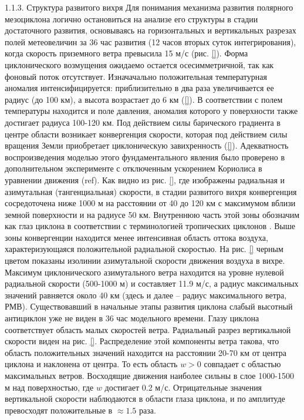 1.1.3.	Структура развитого вихря
Для понимания механизма развития полярного мезоциклона логично остановиться на анализе его структуры в стадии достаточного развития, основываясь на горизонтальных и вертикальных разрезах полей метеовеличин за 36 час развития (12 часов вторых суток интегрирования), когда скорость приземного ветра превысила 15 м/с (рис. \ref{}).
Форма циклонического возмущения ожидаемо остается осесимметричной, так как фоновый поток отсутствует. Изначачально положительная температурная аномалия интенсифицируется: приблизительно в два раза увеличивается ее радиус (до 100 км), а высота возрастает до 6 км (\ref{}). В соответствии с полем температуры находится и поле давления, аномалия которого у поверхности также достигает радиуса 100-120 км. 
Под действием силы барического градиента в центре области возникает конвергенция скорости, которая под действием силы вращения Земли приобретает циклоническую завихренность (\ref{}). Адекватность воспроизведения моделью этого фундаментального явления было проверено в дополнительном эксперименте с отключенным ускорением Кориолиса в уравнении движения (ref{}). Как видно из рис. \ref{}, где изображены радиальная и азимутальная (тангенциальная) скорости, в стадии развитого вихря конвергенция сосредоточена ниже 1000 м на расстоянии от 40 до 120 км с максимумом вблизи земной поверхности и на радиусе 50 км. Внутреннюю часть этой зоны обозначим как глаз циклона в соответствии с терминологией тропических циклонов \cite{Глебова_диссер}. Выше зоны конвергенции находится менее интенсивная область оттока воздуха, характеризующаяся положительной радиальной скоростью.
На рис. \ref{} черным цветом показаны изолинии азимутальной скорости движения воздуха в вихре. Максимум циклонического азимутального ветра находится на уровне нулевой радиальной скорости (500-1000 м) и составляет 11.9 м/с, а радиус максимальных значений равняется около 40 км (здесь и далее – радиус максимального ветра, РМВ). Существовавший в начальные этапы развития циклона слабый высотный антициклон уже не виден в 36 час модельного времени. Глазу циклона соответствует область малых скоростей ветра.
Радиальный разрез вертикальной скорости виден на рис. \ref{}. Распределение этой компоненты ветра такова, что область положительных значений находится на расстоянии 20-70 км от центра циклона и наклонена от центра. То есть область $w>0$ совпадает с областью максимальных ветров. Восходящие движения наиболее сильны в слое 1000-1500 м над поверхностью, где $w$ достигает 0.2 м/с. Отрицательные значения вертикальной скорости наблюдаются в области глаза циклона, и по амплитуде превосходят положительные в $\approx 1.5$ раза. 
